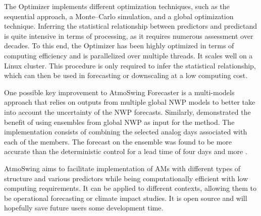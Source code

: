 \documentclass[gmd]{copernicus}
\begin{document}
The Optimizer implements different optimization techniques, such as the sequential approach, a Monte--Carlo simulation, and a global optimization technique. Inferring the statistical relationship between predictors and predictand is quite intensive in terms of processing, as it requires numerous assessment over decades. To this end, the Optimizer has been highly optimized in terms of computing efficiency and is parallelized over multiple threads. It scales well on a Linux cluster. This procedure is only required to infer the statistical relationship, which can then be used in forecasting or downscaling at a low computing cost. 

One possible key improvement to AtmoSwing Forecaster is a multi-models approach that relies on outputs from multiple global NWP models to better take into account the uncertainty of the NWP forecasts. Similarly, \citet{Thevenot2004} demonstrated the benefit of using ensembles from global NWP as input for the method. The implementation consists of combining the selected analog days associated with each of the members. The forecast on the ensemble was found to be more accurate than the deterministic control for a lead time of four days and more \citep{Thevenot2004}. 

AtmoSwing aims to facilitate implementation of AMs with different types of structure and various predictors while being computationally efficient with low computing requirements. It can be applied to different contexts, allowing them to be operational forecasting or climate impact studies. It is open source and will hopefully save future users some development time.





\end{document}
